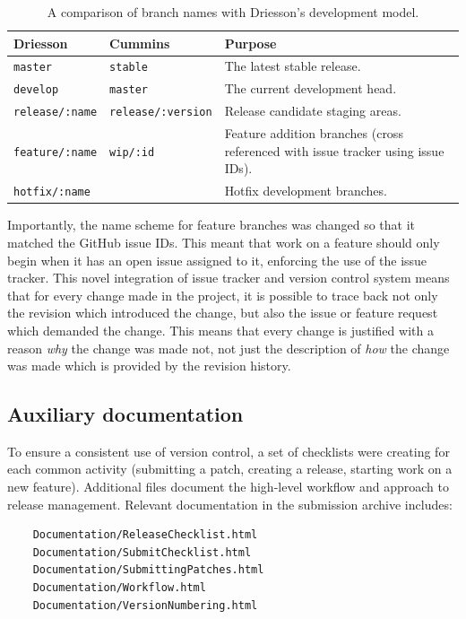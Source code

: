 \begin{table}[H]
\centering
\begin{tabular}{l l L{8cm}}
\textbf{Driesson} & \textbf{Cummins} & \textbf{Purpose}\\
\hline
\texttt{master} & \texttt{stable} & The latest stable release.\\
\texttt{develop} & \texttt{master} & The current development head.\\
\texttt{release/:name} & \texttt{release/:version} & Release candidate staging areas.\\
\texttt{feature/:name} & \texttt{wip/:id} & Feature addition branches (cross referenced with issue tracker using issue IDs).\\
\texttt{hotfix/:name} & & Hotfix development branches.\\
\end{tabular}
\caption[Development model branch names]
        {A comparison of branch names with Driesson's development model.}
\label{tab:branch-names}
\end{table}


Importantly, the name scheme for feature branches was changed so that
it matched the GitHub issue IDs. This meant that work on a feature
should only begin when it has an open issue assigned to it, enforcing
the use of the issue tracker. This novel integration of issue tracker
and version control system means that for every change made in the
project, it is possible to trace back not only the revision which
introduced the change, but also the issue or feature request which
demanded the change. This means that every change is justified with a
reason \textit{why} the change was made not, not just the description
of \textit{how} the change was made which is provided by the revision
history.

\subsection{Auxiliary documentation}\label{subsec:aux-docs}

To ensure a consistent use of version control, a set of checklists
were creating for each common activity (submitting a patch, creating a
release, starting work on a new feature). Additional files document
the high-level workflow and approach to release management. Relevant
documentation in the submission archive includes:

\begin{verbatim}
    Documentation/ReleaseChecklist.html
    Documentation/SubmitChecklist.html
    Documentation/SubmittingPatches.html
    Documentation/Workflow.html
    Documentation/VersionNumbering.html
\end{verbatim}

